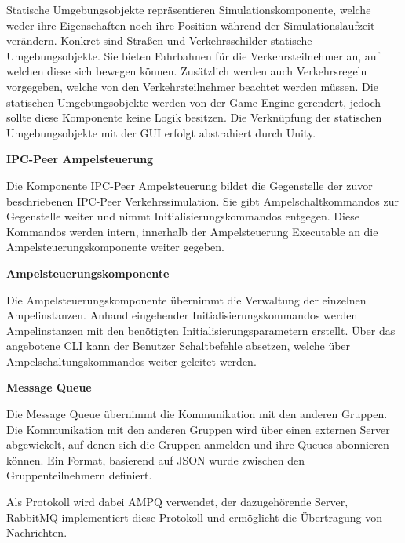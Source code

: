 Statische Umgebungsobjekte repräsentieren Simulationskomponente, welche weder ihre Eigenschaften noch ihre Position während der Simulationslaufzeit verändern. Konkret sind Straßen und Verkehrsschilder statische Umgebungsobjekte. Sie bieten Fahrbahnen für die Verkehrsteilnehmer an, auf welchen diese sich bewegen können. Zusätzlich werden auch Verkehrsregeln vorgegeben, welche von den Verkehrsteilnehmer beachtet werden müssen. Die statischen Umgebungsobjekte werden von der Game Engine gerendert, jedoch sollte diese Komponente keine Logik besitzen. Die Verknüpfung der statischen Umgebungsobjekte mit der GUI erfolgt abstrahiert durch Unity.

\begin{flushleft}
\textbf{IPC-Peer Ampelsteuerung}
\end{flushleft}
\vspace{-0.3 cm}

Die Komponente IPC-Peer Ampelsteuerung bildet die Gegenstelle der zuvor beschriebenen IPC-Peer Verkehrssimulation. Sie gibt Ampelschaltkommandos zur Gegenstelle weiter und nimmt Initialisierungskommandos entgegen. Diese Kommandos werden intern, innerhalb der Ampelsteuerung Executable an die Ampelsteuerungskomponente weiter gegeben.

\begin{flushleft}
\textbf{Ampelsteuerungskomponente}
\end{flushleft}
\vspace{-0.3 cm}

Die Ampelsteuerungskomponente übernimmt die Verwaltung der einzelnen Ampelinstanzen. Anhand eingehender Initialisierungskommandos werden Ampelinstanzen mit den benötigten Initialisierungsparametern erstellt. Über das angebotene CLI kann der Benutzer Schaltbefehle absetzen, welche über Ampelschaltungskommandos weiter geleitet werden.




\begin{flushleft}
\textbf{Message Queue}
\end{flushleft}
\vspace{-0.3 cm}

Die Message Queue übernimmt die Kommunikation mit den anderen Gruppen. Die Kommunikation mit den anderen Gruppen wird über einen externen Server abgewickelt, auf denen sich die Gruppen anmelden und ihre Queues abonnieren können. Ein Format, basierend auf JSON wurde zwischen den Gruppenteilnehmern definiert.

Als Protokoll wird dabei AMPQ verwendet, der dazugehörende Server, RabbitMQ implementiert diese Protokoll und ermöglicht die Übertragung von Nachrichten.
